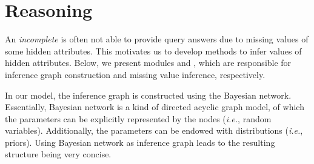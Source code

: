 \section{Reasoning}
\label{sec-reasoning}

An {\em incomplete}  is often not able to provide query answers due to missing values of some hidden attributes. %
This motivates us to develop methods to infer values of hidden attributes. %
Below, we present modules  and , which are responsible for inference graph construction and missing value inference, respectively. 

In our model, the inference graph is constructed using the Bayesian network.
Essentially, Bayesian network is a kind of directed acyclic graph model, of which the parameters can be explicitly represented by the nodes (\textit{i.e.}, random variables).
Additionally, the parameters can be endowed with distributions (\textit{i.e.}, priors). 
Using Bayesian network as inference graph leads to the resulting structure being very concise. %
\par


